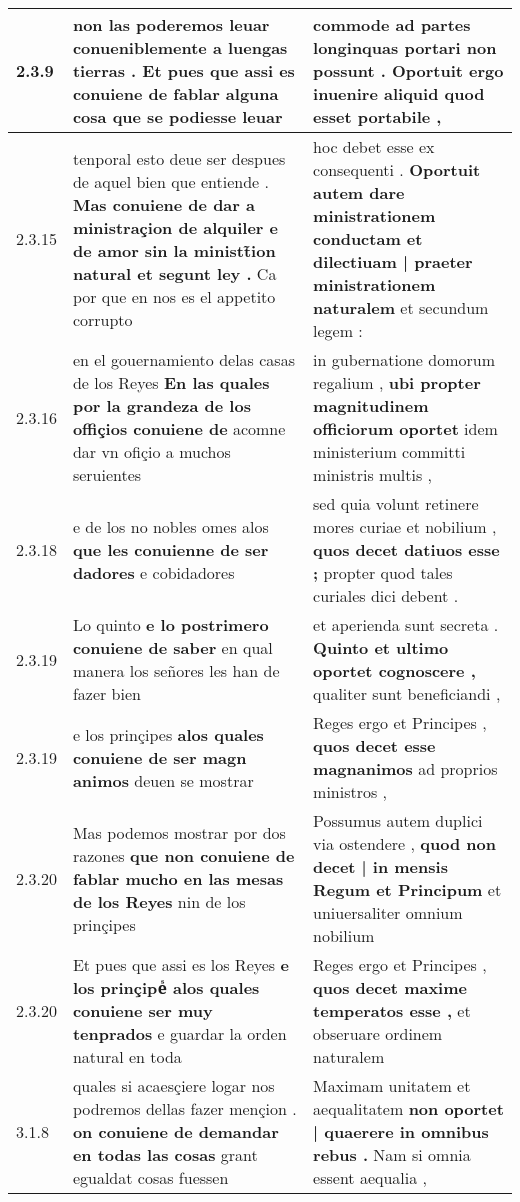 \begin{tabular}{|p{1cm}|p{6.5cm}|p{6.5cm}|}
2.3.9 & non las poderemos leuar conueniblemente a luengas tierras . \textbf{ Et pues que assi es conuiene de fablar alguna cosa } que se podiesse leuar & commode ad partes longinquas portari non possunt . \textbf{ Oportuit ergo inuenire aliquid } quod esset portabile , \\\hline
2.3.15 & tenporal esto deue ser despues de aquel bien que entiende . \textbf{ Mas conuiene de dar a ministraçion de alquiler e de amor sin la ministt̃ion natural et segunt ley . } Ca por que en nos es el appetito corrupto & hoc debet esse ex consequenti . \textbf{ Oportuit autem dare ministrationem conductam et dilectiuam | praeter ministrationem naturalem } et secundum legem : \\\hline
2.3.16 & en el gouernamiento delas casas de los Reyes \textbf{ En las quales por la grandeza de los offiçios conuiene de } acomne dar vn ofiçio a muchos seruientes & in gubernatione domorum regalium , \textbf{ ubi propter magnitudinem officiorum oportet } idem ministerium committi ministris multis , \\\hline
2.3.18 & e de los no nobles omes alos \textbf{ que les conuienne de ser dadores } e cobidadores & sed quia volunt retinere mores curiae et nobilium , \textbf{ quos decet datiuos esse ; } propter quod tales curiales dici debent . \\\hline
2.3.19 & Lo quinto \textbf{ e lo postrimero conuiene de saber } en qual manera los señores les han de fazer bien & et aperienda sunt secreta . \textbf{ Quinto et ultimo oportet cognoscere , } qualiter sunt beneficiandi , \\\hline
2.3.19 & e los prinçipes \textbf{ alos quales conuiene de ser magn animos } deuen se mostrar & Reges ergo et Principes , \textbf{ quos decet esse magnanimos } ad proprios ministros , \\\hline
2.3.20 & Mas podemos mostrar por dos razones \textbf{ que non conuiene de fablar mucho en las mesas de los Reyes } nin de los prinçipes & Possumus autem duplici via ostendere , \textbf{ quod non decet | in mensis Regum et Principum } et uniuersaliter omnium nobilium \\\hline
2.3.20 & Et pues que assi es los Reyes \textbf{ e los prinçipeᷤ alos quales conuiene ser muy tenprados } e guardar la orden natural en toda & Reges ergo et Principes , \textbf{ quos decet maxime temperatos esse , } et obseruare ordinem naturalem \\\hline
3.1.8 & quales si acaesçiere logar nos podremos dellas fazer mençion . \textbf{ on conuiene de demandar en todas las cosas } grant egualdat cosas fuessen & Maximam unitatem et aequalitatem \textbf{ non oportet | quaerere in omnibus rebus . } Nam si omnia essent aequalia , \\\hline

\end{tabular}
